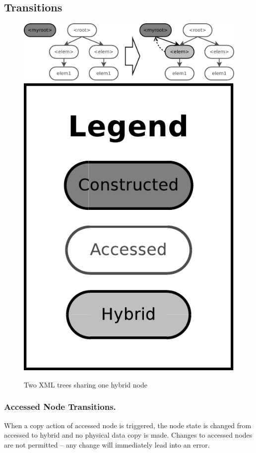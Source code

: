 \documentclass{llncs}
\begin{document}
\subsection{Transitions}
\begin{figure}[ht]
\begin{center}
\includegraphics[scale=0.25]{shared_node}
\includegraphics[scale=0.18]{legend}
\caption{Two XML trees sharing one hybrid node}
\label{fig:sharedNode}
\end{center}
\end{figure}

\subsubsection{Accessed Node Transitions.}    
    When a copy action of accessed node is triggered, the node state is 
    changed from accessed to hybrid and no physical data copy is made. 
    Changes to accessed nodes are not permitted -- any change will immediately
    lead into an error.      
\end{document}
